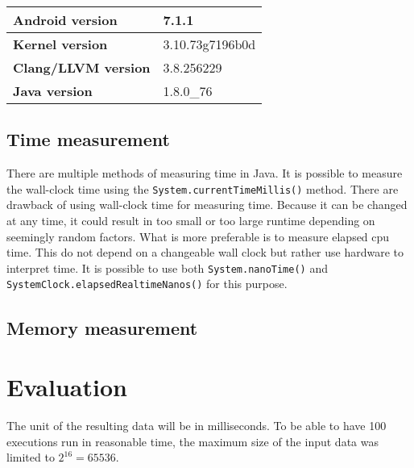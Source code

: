 \begin{table}[H]
    \centering
    \begin{tabular}{|l|l|}
        \hline
        \textbf{Android version} & 7.1.1\\
        \hline
        \textbf{Kernel version} & 3.10.73g7196b0d\\
        \hline
        \textbf{Clang/LLVM version} & 3.8.256229\\
        \hline
        \textbf{Java version} & 1.8.0\_76\\
        \hline
    \end{tabular}
\end{table}


\subsection{Time measurement}
There are multiple methods of measuring time in Java. It is possible to measure the wall-clock time using the \texttt{System.currentTimeMillis()} method. There are drawback of using wall-clock time for measuring time. Because it can be changed at any time, it could result in too small or too large runtime depending on seemingly random factors. What is more preferable is to measure elapsed cpu time. This do not depend on a changeable wall clock but rather use hardware to interpret time. It is possible to use both \texttt{System.nanoTime()} and \texttt{SystemClock.elapsedRealtimeNanos()} for this purpose.

\subsection{Memory measurement}

\section{Evaluation}
The unit of the resulting data will be in milliseconds. To be able to have 100 executions run in reasonable time, the maximum size of the input data was limited to $2^{16} = 65536$. 

